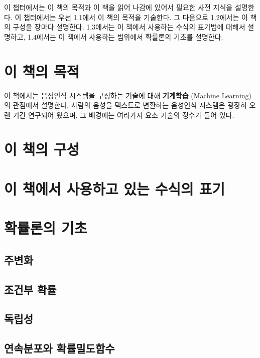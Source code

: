 \documentclass[../main.tex]{subfiles}
\begin{document}
이 챕터에서는 이 책의 목적과 이 책을 읽어 나감에 있어서 필요한 사전 지식을 설명한다. 
이 챕터에서는 우선 1.1에서 이 책의 목적을 기술한다. 
그 다음으로 1.2에서는 이 책의 구성을 장마다 설명한다. 
1.3에서는 이 책에서 사용하는 수식의 표기법에 대해서 설명하고, 1.4에서는 이 책에서 사용하는 범위에서 확률론의 기초를 설명한다. 

\section{이 책의 목적}
이 책에서는 음성인식 시스템을 구성하는 기술에 대해 \textbf{기계학습} (Machine Learning)의 관점에서 설명한다. 
사람의 음성을 텍스트로 변환하는 음성인식 시스템은 굉장히 오랜 기간 연구되어 왔으며, 그 배경에는 여러가지 요소 기술의 정수가 들어 있다. 

\section{이 책의 구성}

\section{이 책에서 사용하고 있는 수식의 표기}

\section{확률론의 기초}
\subsection{주변화}
\subsection{조건부 확률}
\subsection{독립성}
\subsection{연속분포와 확률밀도함수}
\end{document}
